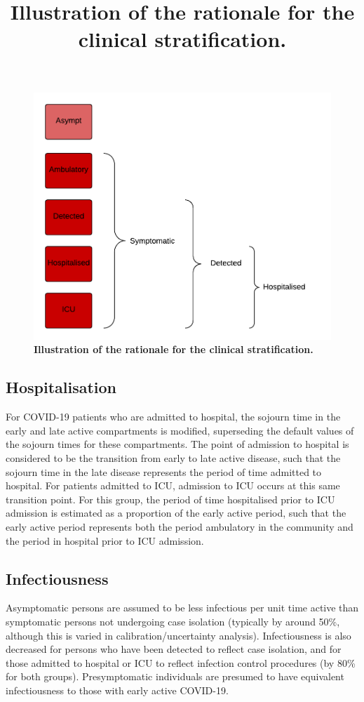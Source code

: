 \begin{figure}[ht]
    \includegraphics[width=\textwidth]{../covid_19/stratifications/covid_19_clinical_rationale.pdf}
    \title{Illustration of the rationale for the clinical stratification.}
	\caption{\textbf{Illustration of the rationale for the clinical stratification.}}
    \label{fig:clinical_rationale}
\end{figure}

\subsection{Hospitalisation} \label{hosp}
For COVID-19 patients who are admitted to hospital, the sojourn time in the early and late active compartments is modified, superseding the default values of the sojourn times for these compartments. The point of admission to hospital is considered to be the transition from early to late active disease, such that the sojourn time in the late disease represents the period of time admitted to hospital. For patients admitted to ICU, admission to ICU occurs at this same transition point. For this group, the period of time hospitalised prior to ICU admission is estimated as a proportion of the early active period, such that the early active period represents both the period ambulatory in the community and the period in hospital prior to ICU admission.

\subsection{Infectiousness} \label{infect}
Asymptomatic persons are assumed to be less infectious per unit time active than symptomatic persons not undergoing case isolation (typically by around 50\%, although this is varied in calibration/uncertainty analysis). Infectiousness is also decreased for persons who have been detected to reflect case isolation, and for those admitted to hospital or ICU to reflect infection control procedures (by 80\% for both groups). Presymptomatic individuals are presumed to have equivalent infectiousness to those with early active COVID-19.

